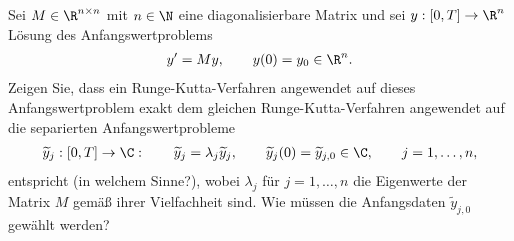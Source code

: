\begin{exercise}
Sei $M \in \R^{n \times n}$ mit $n \in \N$ eine diagonalisierbare Matrix und sei
$y: [0,T] \rightarrow \R^n$ Lösung des Anfangswertproblems
\begin{align*}
  y^{\prime} = My, \qquad y(0) = y_0 \in \R^n.
\end{align*}
Zeigen Sie, dass ein Runge-Kutta-Verfahren angewendet auf dieses Anfangswertproblem
exakt dem gleichen Runge-Kutta-Verfahren angewendet auf die separierten Anfangswertprobleme
\begin{align*}
  \widetilde{y}_j: [0,T] \rightarrow \C: \qquad \widetilde{y}_j = \lambda_j\widetilde{y}_j,
  \qquad \widetilde{y}_j(0) = \widetilde{y}_{j,0} \in \C, \qquad j = 1,\dots,n,
\end{align*}
entspricht (in welchem Sinne?), wobei $\lambda_j$ für $j = 1,\dots,n$ die Eigenwerte
der Matrix $M$ gemäß ihrer Vielfachheit sind. Wie müssen die Anfangsdaten $\widetilde{y}_{j,0}$
gewählt werden?
\end{exercise}
